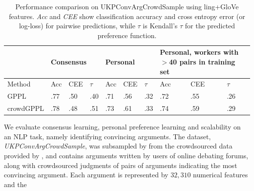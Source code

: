 \begin{table}
\small
\begin{tabularx}{\columnwidth}{ | l | X | X | X | X | X | X | X | X | X |}
\hline
 & \multicolumn{3}{l|}{Consensus}&\multicolumn{3}{l|}{Personal} &\multicolumn{3}{p{3.1cm}|}{Personal, workers with $>$40 pairs in training set} \\ \hline
 Method & Acc & CEE & $\tau$ & Acc & CEE & $\tau$ & Acc & CEE & $\tau$ \\ \hline
 GPPL %
  & .77 & .50 & .40 & .71 & .56 & .32 & .72 & .55 & .26 \\ %
 crowdGPPL %
 & .78 & .48 & .51 & .73 & .61 & .33 & .74 & .59 & .29  %
 \\\hline
\end{tabularx}
\caption{Performance comparison on UKPConvArgCrowdSample using ling+GloVe features. \emph{Acc} and \emph{CEE} show classification accuracy and cross entropy error (or log-loss) for pairwise predictions, 
while $\tau$ is Kendall's $\tau$ for the predicted preference function. }
\label{tab:convarg}
\end{table}
We evaluate consensus learning, personal preference learning and scalability
on an NLP task, namely identifying convincing arguments. 
The dataset, \emph{UKPConvArgCrowdSample}, was subsampled by \citet{simpson2018finding}
from the crowdsourced data provided by \citet{habernal2016argument}, and
contains arguments written by users
of online debating forums,
along with crowdsourced judgments of pairs of arguments
 indicating the most convincing argument.
Each argument is represented by $32,310$ numerical features and the
